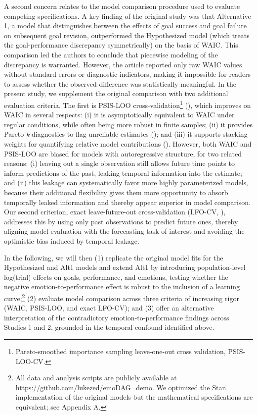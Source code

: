 \documentclass[
  man,
  floatsintext,
  longtable,
  nolmodern,
  notxfonts,
  notimes,
  colorlinks=true,linkcolor=blue,citecolor=blue,urlcolor=blue]{apa7}
\begin{document}
A second concern relates to the model comparison procedure used to
evaluate competing specifications. A key finding of the original study
was that Alternative 1, a model that distinguishes between the effects
of goal success and goal failure on subsequent goal revision,
outperformed the Hypothesized model (which treats the goal-performance
discrepancy symmetrically) on the basis of WAIC. This comparison led the
authors to conclude that piecewise modeling of the discrepancy is
warranted. However, the article reported only raw WAIC values without
standard errors or diagnostic indicators, making it impossible for
readers to assess whether the observed difference was statistically
meaningful. In the present study, we supplement the original comparison
with two additional evaluation criteria. The first is PSIS-LOO
cross-validation\footnote{Pareto-smoothed importance sampling
  leave-one-out cross validation, PSIS-LOO-CV.}
(), which
improves on WAIC in several respects: (i) it is asymptotically
equivalent to WAIC under regular conditions, while often being more
robust in finite samples; (ii) it provides Pareto \emph{k} diagnostics
to flag unreliable estimates (); and (iii) it supports stacking weights for quantifying
relative model contributions (). However, both WAIC and PSIS-LOO are biased for models with
autoregressive structure, for two related reasons: (i) leaving out a
single observation still allows future time points to inform predictions
of the past, leaking temporal information into the estimate; and (ii)
this leakage can systematically favor more highly parameterized models,
because their additional flexibility gives them more opportunity to
absorb temporally leaked information and thereby appear superior in
model comparison. Our second criterion, exact leave-future-out
cross-validation (LFO-CV, ), addresses this by using only past observations to predict
future ones, thereby aligning model evaluation with the forecasting task
of interest and avoiding the optimistic bias induced by temporal
leakage.

In the following, we will then (1) replicate the original model fits for
the Hypothesized and Alt1 models and extend Alt1 by introducing
population-level log(trial) effects on goals, performance, and emotions,
testing whether the negative emotion-to-performance effect is robust to
the inclusion of a learning curve;\footnote{All data and analysis
  scripts are publicly available at
  https://github.com/lukezed/emoDAG\_demo. We optimized the Stan
  implementation of the original models but the mathematical
  specifications are equivalent; see Appendix A.} (2) evaluate model
comparison across three criteria of increasing rigor (WAIC, PSIS-LOO,
and exact LFO-CV); and (3) offer an alternative interpretation of the
contradictory emotion-to-performance findings across Studies 1 and 2,
grounded in the temporal confound identified above.
\end{document}
